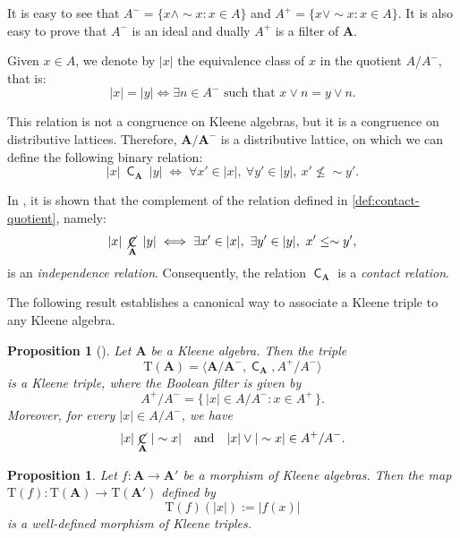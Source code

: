 \documentclass[10pt,a4paper]{amsart}
\newtheorem{proposition}[theorem]{Proposition}
\DeclareMathOperator{\con}{\mathsf{C}}
\DeclareMathOperator{\notcon}{\cancel{ \con}}
\newcommand{\A}{\mathbf{A}}
\begin{document}
It is easy to see that $A^{-}= \{ x \wedge \sim x : x \in A \}$ and $A^{+}= \{ x \vee \sim x : x \in A \}$. It is also easy to prove that $A^{-}$ is an ideal and dually $A^{+}$ is a filter of $\A$.


Given $x \in A$, we denote by $|x|$ the equivalence class of $x$ in the quotient $A / A^{-}$, that is:
\begin{equation}
\label{eq:nega-quotient}
    |x| = |y| \iff \exists n \in A^{-}\text{ such that } x \vee n = y \vee n.
\end{equation}

This relation is not a congruence on Kleene algebras, but it is a congruence on distributive lattices. Therefore, $\mathbf{A / A^{-}}$  is a distributive lattice, on which we can define the following binary relation:
\begin{equation}\label{def:contact-quotient}
|x|\ \con_\A\ |y| \;\Longleftrightarrow\;
\forall x' \in |x|,\ \forall y' \in |y|,\ x' \nleq \sim y'.
\end{equation}

In \cite{jalali}, it is shown that the complement of the relation defined in \eqref{def:contact-quotient}, namely:
\begin{equation}
    \label{def:independence}
    |x|\ \notcon_\A\ |y| \;\Longleftrightarrow\;
    \exists x' \in |x|,\ \exists y' \in |y|,\ x' \leq \sim y',
\end{equation}
is an \emph{independence relation}. Consequently, the relation $\con_\A$ is a \emph{contact relation}.

The following result establishes a canonical way to associate a Kleene triple to any Kleene algebra.

\begin{proposition}[\cite{jalali}]
\label{prop:Tfunctor}
Let $\A$ be a Kleene algebra. Then the triple \[
\mathrm{T}(\A)= \langle \mathbf{A / A^{-}} , \con_\A, A^{+}  / A^{-} \rangle\]
is a Kleene triple, where the Boolean filter is given by
\[
A^{+}  / A^{-} = \{\, |x| \in A / A^{-} : x \in A^{+}  \,\}.
\]
Moreover, for every $|x| \in A / A^{-}$, we have
\[
|x|\, \notcon_\A\, |\sim x| \quad \text{and} \quad |x| \vee |\sim x| \in A^{+}  / A^{-}.
\]
\end{proposition}

\begin{proposition}
\label{prop:Tfunctor-mor}
Let $f \colon \A \to \A'$ be a morphism of Kleene algebras. Then the map $\mathrm{T}(f) \colon \mathrm{T}(\A) \to \mathrm{T}(\A')$ defined by
\[
\mathrm{T}(f)(|x|) := |f(x)|
\]
is a well-defined morphism of Kleene triples.
\end{proposition}
\end{document}
